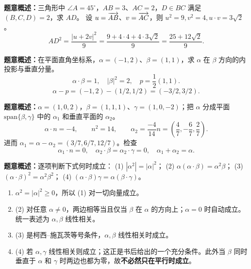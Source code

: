 \textbf{题意概述：}三角形中 $\angle A=45^\circ$，$AB=3$、$AC=2$，$D\in BC$ 满足 $(B,C,D)=2$，求 $AD$。
设 $u=\overrightarrow{AB}$、$v=\overrightarrow{AC}$，则 $u^2=9,v^2=4,u\cdot v=3\sqrt2$。
\[
AD^2=\frac{|u+2v|^2}{9}=
\frac{9+4\cdot4+4\cdot3\sqrt2}{9}=\frac{25+12\sqrt2}{9}.
\]

\textbf{题意概述：}在平面直角坐标系，$\alpha=(-1,2)$、$\beta=(1,1)$，求 $\alpha$ 在 $\beta$ 方向的内投影与垂直分量。
\[
\alpha\cdot\beta=1,\quad |\beta|^2=2,\quad p=\frac12(1,1).
\]
\[
\alpha-p=(-1,2)-(1/2,1/2)=(-3/2,3/2).
\]

\textbf{题意概述：}$\alpha=(1,0,2)$，$\beta=(1,1,1)$、$\gamma=(1,0,-2)$；把 $\alpha$ 分成平面 $\mathrm{span}\{\beta,\gamma\}$ 中的 $\alpha_1$ 和垂直平面的 $\alpha_2$。
\[
\alpha\cdot n=-4,\qquad n^2=14,\qquad
\alpha_2=\frac{-4}{14}n=\left(\frac47,-\frac67,\frac27\right).
\]
进而 $\alpha_1=\alpha-\alpha_2=(3/7,6/7,12/7)$。检查
\[
\alpha_1\cdot n=0,\quad \alpha_2\cdot\beta=\alpha_2\cdot\gamma=0,\quad \alpha_1+\alpha_2=\alpha.
\]

\textbf{题意概述：}逐项判断下式何时成立：
(1) $|\alpha^2|=|\alpha|^2$；
(2) $\alpha(\alpha\cdot\beta)=\alpha^2\beta$；
(3) $(\alpha\cdot\beta)^2=\alpha^2\beta^2$；
(4) $(\alpha\cdot\beta)\gamma=\alpha(\beta\cdot\gamma)$。
\begin{enumerate}
\item $\alpha^2=|\alpha|^2\ge 0$，所以 (1) 对一切向量成立。
\item (2) 对任意 $\alpha\neq0$，两边相等当且仅当 $\beta$ 在 $\alpha$ 的方向上；$\alpha=0$ 时自动成立。统一表述为 $\alpha,\beta$ 线性相关。
\item (3) 是柯西--施瓦茨等号条件，$\alpha,\beta$ 线性相关时成立。
\item (4) 若 $\alpha,\gamma$ 线性相关则成立；这正是书后给出的一个充分条件。此外当 $\beta$ 同时垂直于 $\alpha$ 和 $\gamma$ 时两边也都为零，故\textbf{不必然只在平行时成立}。
\end{enumerate}

